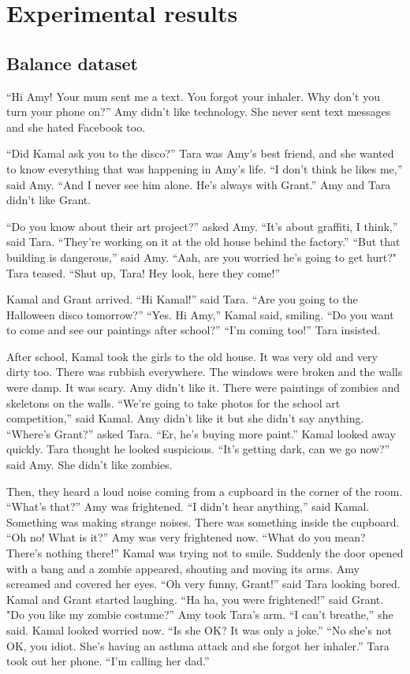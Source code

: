 \section{Experimental results}
\label{sec:experiments}

\subsection{Balance dataset}

“Hi Amy! Your mum sent me a text. You forgot your inhaler. Why don’t you turn your phone on?” Amy didn’t like technology. She never sent text messages and she hated Facebook too.

“Did Kamal ask you to the disco?” Tara was Amy’s best friend, and she wanted to know everything that was happening in Amy’s life. “I don’t think he likes me,” said Amy. “And I never see him alone. He’s always with Grant.” Amy and Tara didn’t like Grant.

“Do you know about their art project?” asked Amy. “It’s about graffiti, I think,” said Tara. “They’re working on it at the old house behind the factory.” “But that building is dangerous,” said Amy. “Aah, are you worried he’s going to get hurt?" Tara teased. “Shut up, Tara! Hey look, here they come!”

Kamal and Grant arrived. “Hi Kamal!” said Tara. “Are you going to the Halloween disco tomorrow?” “Yes. Hi Amy,” Kamal said, smiling. “Do you want to come and see our paintings after school?” “I’m coming too!” Tara insisted.

After school, Kamal took the girls to the old house. It was very old and very dirty too. There was rubbish everywhere. The windows were broken and the walls were damp. It was scary. Amy didn’t like it. There were paintings of zombies and skeletons on the walls. “We’re going to take photos for the school art competition,” said Kamal. Amy didn’t like it but she didn’t say anything. “Where’s Grant?” asked Tara. “Er, he’s buying more paint.” Kamal looked away quickly. Tara thought he looked suspicious. “It’s getting dark, can we go now?” said Amy. She didn’t like zombies.

Then, they heard a loud noise coming from a cupboard in the corner of the room. “What’s that?” Amy was frightened. “I didn’t hear anything,” said Kamal. Something was making strange noises. There was something inside the cupboard. “Oh no! What is it?” Amy was very frightened now. “What do you mean? There’s nothing there!” Kamal was trying not to smile. Suddenly the door opened with a bang and a zombie appeared, shouting and moving its arms. Amy screamed and covered her eyes. “Oh very funny, Grant!” said Tara looking bored. Kamal and Grant started laughing. “Ha ha, you were frightened!” said Grant. "Do you like my zombie costume?” Amy took Tara’s arm. “I can’t breathe,” she said. Kamal looked worried now. “Is she OK? It was only a joke.” “No she’s not OK, you idiot. She’s having an asthma attack and she forgot her inhaler.” Tara took out her phone. “I’m calling her dad.”

